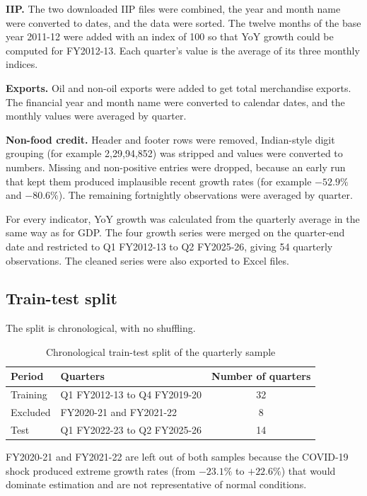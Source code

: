 \documentclass[11pt, a4paper]{article}
\begin{document}
\textbf{IIP.} The two downloaded IIP files were combined, the year and month name were converted to dates, and the data were sorted. The twelve months of the base year 2011-12 were added with an index of 100 so that YoY growth could be computed for FY2012-13. Each quarter's value is the average of its three monthly indices.

\textbf{Exports.} Oil and non-oil exports were added to get total merchandise exports. The financial year and month name were converted to calendar dates, and the monthly values were averaged by quarter.

\textbf{Non-food credit.} Header and footer rows were removed, Indian-style digit grouping (for example 2,29,94,852) was stripped and values were converted to numbers. Missing and non-positive entries were dropped, because an early run that kept them produced implausible recent growth rates (for example $-52.9\%$ and $-80.6\%$). The remaining fortnightly observations were averaged by quarter.

For every indicator, YoY growth was calculated from the quarterly average in the same way as for GDP. The four growth series were merged on the quarter-end date and restricted to Q1 FY2012-13 to Q2 FY2025-26, giving 54 quarterly observations. The cleaned series were also exported to Excel files.

\subsection{Train-test split}
The split is chronological, with no shuffling.

\begin{table}[h!]
\centering
\renewcommand{\arraystretch}{1.2}
\begin{tabular}{l l c}
\toprule
\textbf{Period} & \textbf{Quarters} & \textbf{Number of quarters} \\
\midrule
Training & Q1 FY2012-13 to Q4 FY2019-20 & 32 \\
Excluded & FY2020-21 and FY2021-22 & 8 \\
Test & Q1 FY2022-23 to Q2 FY2025-26 & 14 \\
\bottomrule
\end{tabular}
\caption{Chronological train-test split of the quarterly sample}
\end{table}

FY2020-21 and FY2021-22 are left out of both samples because the COVID-19 shock produced extreme growth rates (from $-23.1\%$ to $+22.6\%$) that would dominate estimation and are not representative of normal conditions.
\end{document}
